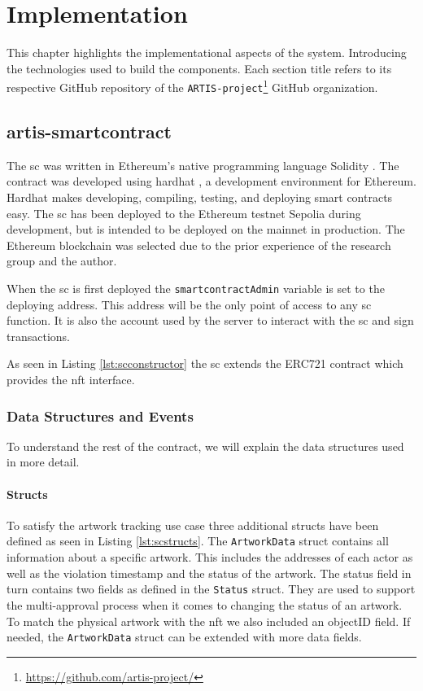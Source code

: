 \chapter{Implementation}
\label{chap:implementation}
This chapter highlights the implementational aspects of the system. Introducing the technologies used to build the components. Each section title refers to its respective GitHub repository of the \texttt{ARTIS-project}\footnote{\href{https://github.com/artis-project/}{https://github.com/artis-project/}} GitHub organization.

\section{artis-smartcontract}
The \gls{sc} was written in Ethereum's native programming language Solidity \cite{solidity}. The contract was developed using hardhat \cite{hardhat}, a development environment for Ethereum. Hardhat makes developing, compiling, testing, and deploying smart contracts easy. The \gls{sc} has been deployed to the Ethereum testnet Sepolia \cite{sepolia} during development, but is intended to be deployed on the mainnet in production. The Ethereum blockchain was selected due to the prior experience of the research group and the author.

When the \gls{sc} is first deployed the \texttt{smartcontractAdmin} variable is set to the deploying address. This address will be the only point of access to any \gls{sc} function. It is also the account used by the server to interact with the \gls{sc} and sign transactions.



As seen in Listing \ref{lst:scconstructor} the \gls{sc} extends the ERC721 \cite{erc721} contract which provides the \gls{nft} interface.

\subsection{Data Structures and Events}
To understand the rest of the contract, we will explain the data structures used in more detail.

\subsubsection{Structs}
To satisfy the artwork tracking use case three additional structs have been defined as seen in Listing \ref{lst:scstructs}. The \texttt{ArtworkData} struct contains all information about a specific artwork. This includes the addresses of each actor as well as the violation timestamp and the status of the artwork. The status field in turn contains two fields as defined in the \texttt{Status} struct. They are used to support the multi-approval process when it comes to changing the status of an artwork. To match the physical artwork with the \gls{nft} we also included an objectID field. If needed, the \texttt{ArtworkData} struct can be extended with more data fields.

